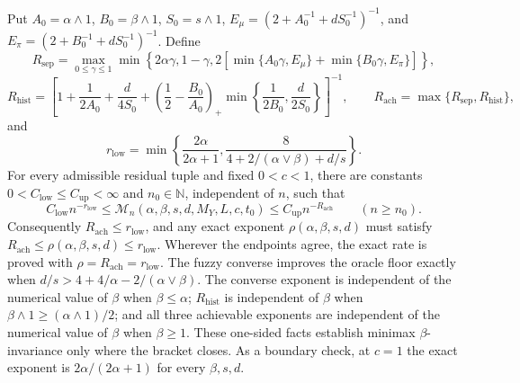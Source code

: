 Put \(A_0=\alpha\wedge1\), \(B_0=\beta\wedge1\), \(S_0=s\wedge1\), \(E_\mu=(2+A_0^{-1}+dS_0^{-1})^{-1}\), and \(E_\pi=(2+B_0^{-1}+dS_0^{-1})^{-1}\). Define
\[
R_{\mathrm{sep}}=\max_{0\le\gamma\le1}\min\left\{2\alpha\gamma,1-\gamma,2\left[\min\{A_0\gamma,E_\mu\}+\min\{B_0\gamma,E_\pi\}\right]\right\},
\]
\[
R_{\mathrm{hist}}=\left[1+\frac1{2A_0}+\frac d{4S_0}+\left(\frac12-\frac{B_0}{A_0}\right)_+\min\left\{\frac1{2B_0},\frac d{2S_0}\right\}\right]^{-1},
\qquad R_{\mathrm{ach}}=\max\{R_{\mathrm{sep}},R_{\mathrm{hist}}\},
\]
and
\[
r_{\mathrm{low}}=\min\left\{\frac{2\alpha}{2\alpha+1},\frac{8}{4+2/(\alpha\vee\beta)+d/s}\right\}.
\]
For every admissible residual tuple and fixed \(0<c<1\), there are constants \(0<C_{\mathrm{low}}\le C_{\mathrm{up}}<\infty\) and \(n_0\in\mathbb N\), independent of \(n\), such that
\[
C_{\mathrm{low}}n^{-r_{\mathrm{low}}}\le\mathcal M_n(\alpha,\beta,s,d,M_Y,L,c,t_0)\le C_{\mathrm{up}}n^{-R_{\mathrm{ach}}}\qquad(n\ge n_0).
\]
Consequently \(R_{\mathrm{ach}}\le r_{\mathrm{low}}\), and any exact exponent \(\rho(\alpha,\beta,s,d)\) must satisfy \(R_{\mathrm{ach}}\le\rho(\alpha,\beta,s,d)\le r_{\mathrm{low}}\). Wherever the endpoints agree, the exact rate is proved with \(\rho=R_{\mathrm{ach}}=r_{\mathrm{low}}\). The fuzzy converse improves the oracle floor exactly when \(d/s>4+4/\alpha-2/(\alpha\vee\beta)\). The converse exponent is independent of the numerical value of \(\beta\) when \(\beta\le\alpha\); \(R_{\mathrm{hist}}\) is independent of \(\beta\) when \(\beta\wedge1\ge(\alpha\wedge1)/2\); and all three achievable exponents are independent of the numerical value of \(\beta\) when \(\beta\ge1\). These one-sided facts establish minimax \(\beta\)-invariance only where the bracket closes. As a boundary check, at \(c=1\) the exact exponent is \(2\alpha/(2\alpha+1)\) for every \(\beta,s,d\).